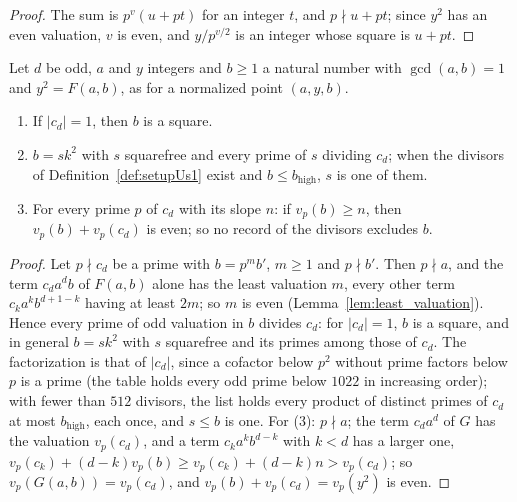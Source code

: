 \begin{proof}
  \leanok
  The sum is $p^v (u + p t)$ for an integer $t$, and $p \nmid u + p t$; since $y^2$ has an even
  valuation, $v$ is even, and $y / p^{v / 2}$ is an integer whose square is $u + p t$.
\end{proof}

\begin{lemma}\label{lem:odd_denominators}
  \leanok
  Let $d$ be odd, $a$ and $y$ integers and $b \ge 1$ a natural number with $\gcd(a, b) = 1$ and
  $y^2 = F(a, b)$, as for a normalized point $(a, y, b)$.
  \begin{enumerate}
    \item If $|c_d| = 1$, then $b$ is a square.
    \item $b = s k^2$ with $s$ squarefree and every prime of $s$ dividing $c_d$; when the divisors
      of Definition~\ref{def:setupUs1} exist and $b \le b_{\mathrm{high}}$, $s$ is one of them.
    \item For every prime $p$ of $c_d$ with its slope $n$: if $v_p(b) \ge n$, then
      $v_p(b) + v_p(c_d)$ is even; so no record of the divisors excludes $b$.
  \end{enumerate}
\end{lemma}

\begin{proof}
  \leanok
  Let $p \nmid c_d$ be a prime with $b = p^m b'$, $m \ge 1$ and $p \nmid b'$. Then $p \nmid a$, and
  the term $c_d a^d b$ of $F(a, b)$ alone has the least valuation $m$, every other term
  $c_k a^k b^{d + 1 - k}$ having at least $2m$; so $m$ is even (Lemma~\ref{lem:least_valuation}).
  Hence every prime of odd valuation in $b$ divides $c_d$: for $|c_d| = 1$, $b$ is a square, and in
  general $b = s k^2$ with $s$ squarefree and its primes among those of $c_d$. The factorization is
  that of $|c_d|$, since a cofactor below $p^2$ without prime factors below $p$ is a prime (the
  table holds every odd prime below $1022$ in increasing order); with fewer than $512$ divisors, the
  list holds every product of distinct primes of $c_d$ at most $b_{\mathrm{high}}$, each once, and
  $s \le b$ is one. For (3): $p \nmid a$; the term $c_d a^d$ of $G$ has the valuation $v_p(c_d)$,
  and a term $c_k a^k b^{d - k}$ with $k < d$ has a larger one,
  $v_p(c_k) + (d - k) v_p(b) \ge v_p(c_k) + (d - k) n > v_p(c_d)$; so $v_p(G(a, b)) = v_p(c_d)$, and
  $v_p(b) + v_p(c_d) = v_p(y^2)$ is even.
\end{proof}

